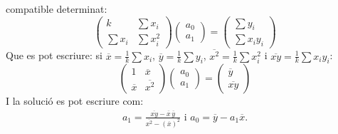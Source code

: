 \documentclass[
  11pt,
]{book}
\numberwithin{dummy}{section}
\theoremstyle{maincolornumbox}
\theoremstyle{blacknumex}
\theoremstyle{blacknumbox}
\theoremstyle{maincolornum}
\begin{document}
compatible determinat: \[\begin{pmatrix}
k & \sum x_i \\ \sum x_i & \sum x_i^2 
\end{pmatrix}
\begin{pmatrix} a_0 \\ a_1 \end{pmatrix} = 
\begin{pmatrix} \sum y_i \\ \sum x_iy_i \end{pmatrix}\] Que es pot
escriure: si \(\overline x = \frac{1}{k} \sum x_i\),
\(\overline y=\frac{1}{k} \sum y_i\),
\(\overline {x^2}= \frac{1}{k} \sum x_i^2\) i
\(\overline {xy}= \frac{1}{k} \sum x_iy_i\): \[\begin{pmatrix}
1 & \overline x \\ \overline x & \overline{x^2} 
\end{pmatrix}
\begin{pmatrix} a_0 \\ a_1 \end{pmatrix} = 
\begin{pmatrix}  \overline y \\ \overline{xy} \end{pmatrix}\] I la
solució es pot escriure com: \begin{align*}
\label{eq:recta-reg}
a_1=\frac{\overline{xy} - \overline x \, \overline y}{\overline{x^2} - (\overline x)^2}
\text{ i } 
a_0= \overline y - a_1 \overline x .
\end{align*}
\end{document}
